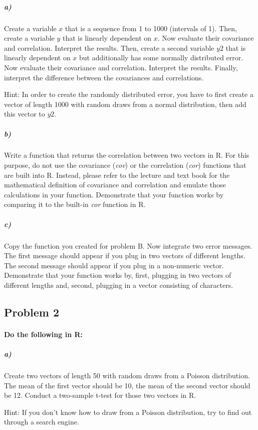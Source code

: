 \documentclass[12pt,letter]{article}
\begin{document}
\subparagraph{a)} Create a variable $x$ that is a sequence from 1 to 1000 (intervals of 1). Then, create a variable $y$ that is linearly dependent on $x$. Now evaluate their covariance and correlation. Interpret the results. Then, create a second variable $y2$ that is linearly dependent on $x$ but additionally has some normally distributed error. Now evaluate their covariance and correlation. Interpret the results. Finally, interpret the difference between the covariances and correlations.

Hint: In order to create the randomly distributed error, you have to first create a vector of length 1000 with random draws from a normal distribution, then add this vector to $y2$.

\subparagraph{b)} Write a function that returns the correlation between two vectors in R. For this purpose, do not use the covariance (\textit{cov}) or the correlation (\textit{cor}) functions that are built into R. Instead, please refer to the lecture and text book for the mathematical definition of covariance and correlation and emulate those calculations in your function. Demonstrate that your function works by comparing it to the built-in \textit{cor} function in R.

\subparagraph{c)} Copy the function you created for problem B. Now integrate two error messages. The first message should appear if you plug in two vectors of different lengths. The second message should appear if you plug in a non-numeric vector. Demonstrate that your function works by, first, plugging in two vectors of different lengths and, second, plugging in a vector consisting of characters.



\subsection*{Problem 2}

\paragraph{Do the following in R:}

\subparagraph{a)} Create two vectors of length 50 with random draws from a Poisson distribution. The mean of the first vector should be 10, the mean of the second vector should be 12. Conduct a two-sample t-test for those two vectors in R.

Hint: If you don't know how to draw from a Poisson distribution, try to find out through a search engine.
\end{document}

